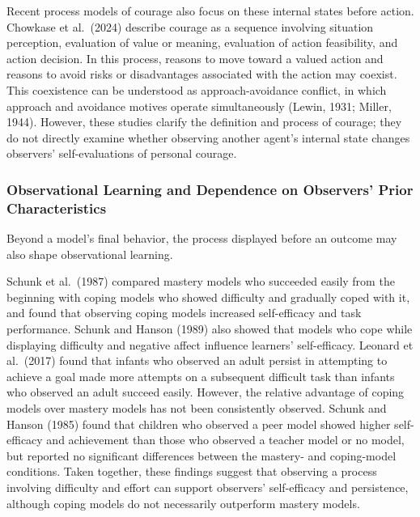 Recent process models of courage also focus on these internal states
before action. Chowkase et al.~(2024) describe courage as a sequence
involving situation perception, evaluation of value or meaning,
evaluation of action feasibility, and action decision. In this process,
reasons to move toward a valued action and reasons to avoid risks or
disadvantages associated with the action may coexist. This coexistence
can be understood as approach-avoidance conflict, in which approach and
avoidance motives operate simultaneously (Lewin, 1931; Miller, 1944).
However, these studies clarify the definition and process of courage;
they do not directly examine whether observing another agent's internal
state changes observers' self-evaluations of personal courage.

\subsubsection{Observational Learning and Dependence on Observers' Prior
Characteristics}\label{observational-learning-and-dependence-on-observers-prior-characteristics}

Beyond a model's final behavior, the process displayed before an outcome
may also shape observational learning.

Schunk et al.~(1987) compared mastery models who succeeded easily from
the beginning with coping models who showed difficulty and gradually
coped with it, and found that observing coping models increased
self-efficacy and task performance. Schunk and Hanson (1989) also showed
that models who cope while displaying difficulty and negative affect
influence learners' self-efficacy. Leonard et al.~(2017) found that
infants who observed an adult persist in attempting to achieve a goal
made more attempts on a subsequent difficult task than infants who
observed an adult succeed easily. However, the relative advantage of
coping models over mastery models has not been consistently observed.
Schunk and Hanson (1985) found that children who observed a peer model
showed higher self-efficacy and achievement than those who observed a
teacher model or no model, but reported no significant differences
between the mastery- and coping-model conditions. Taken together, these
findings suggest that observing a process involving difficulty and
effort can support observers' self-efficacy and persistence, although
coping models do not necessarily outperform mastery models.

